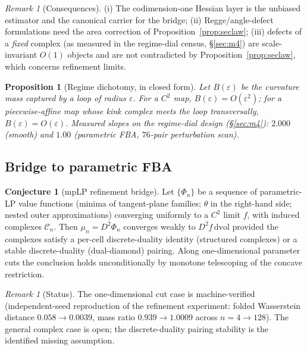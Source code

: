 \documentclass[11pt,a4paper]{article}
\theoremstyle{plain}
\newtheorem{proposition}[theorem]{Proposition}
\theoremstyle{definition}
\newtheorem{conjecture}[theorem]{Conjecture}
\theoremstyle{remark}
\newtheorem{remark}[theorem]{Remark}
\newcommand{\dvol}{\,\mathrm{dvol}}
\begin{document}
\begin{remark}[Consequences]
(i) The codimension-one Hessian layer is the unbiased estimator and the
canonical carrier for the bridge; (ii) Regge/angle-defect formulations
need the area correction of Proposition~\ref{prop:seclaw}; (iii) defects
of a \emph{fixed} complex (as measured in the regime-dial census, \S\ref{sec:m4}) are
scale-invariant $O(1)$ objects and are not contradicted by
Proposition~\ref{prop:seclaw}, which concerns refinement limits.
\end{remark}

\begin{proposition}[Regime dichotomy, in closed form]
\label{prop:dichotomy}
Let $B(\varepsilon)$ be the curvature mass captured by a loop of radius
$\varepsilon$. For a $C^2$ map, $B(\varepsilon) = O(\varepsilon^2)$; for a
piecewise-affine map whose kink complex meets the loop transversally,
$B(\varepsilon) = O(\varepsilon)$. Measured slopes on the regime-dial design (\S\ref{sec:m4}): $2.000$ (smooth) and $1.00$ (parametric FBA,
$76$-pair perturbation scan).
\end{proposition}

\subsection{Bridge to parametric FBA}

\begin{conjecture}[mpLP refinement bridge]\label{conj:bridge}
Let $\{\Phi_n\}$ be a sequence of parametric-LP value functions (minima of
tangent-plane families; $\theta$ in the right-hand side; nested outer
approximations) converging uniformly to a $C^2$ limit $f$, with induced
complexes $\mathcal{C}_n$. Then $\mu_n = D^2\Phi_n$ converges weakly to
$D^2 f \dvol$ provided the complexes satisfy a per-cell discrete-duality
identity (structured complexes) or a stable discrete-duality
(dual-diamond) pairing. Along one-dimensional parameter cuts the
conclusion holds unconditionally by monotone telescoping of the concave
restriction.
\end{conjecture}

\begin{remark}[Status]
The one-dimensional cut case is machine-verified (independent-seed
reproduction of the refinement experiment: folded Wasserstein distance
$0.058 \to 0.0039$, mass ratio $0.939 \to 1.0009$ across
$n = 4 \to 128$). The general complex case is open; the discrete-duality
pairing stability is the identified missing assumption.
\end{remark}
\end{document}
